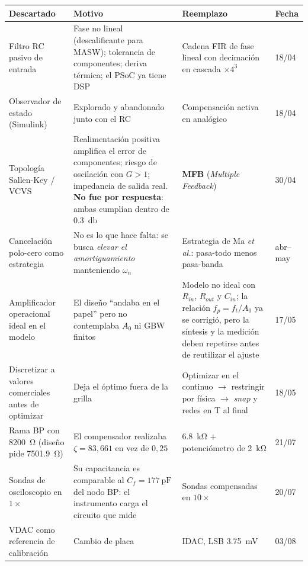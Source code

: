 \begin{center}\footnotesize
\begin{tabularx}{\textwidth}{@{}l X X l@{}}
\toprule
\textbf{Descartado} & \textbf{Motivo} & \textbf{Reemplazo} & \textbf{Fecha} \\
\midrule
Filtro RC pasivo de entrada
& Fase no lineal (descalificante para MASW); tolerancia de componentes; deriva t\'ermica; el PSoC ya tiene DSP
& Cadena FIR de fase lineal con decimaci\'on en cascada $\times4^3$
& 18/04 \\
\addlinespace[2pt]
Observador de estado (Simulink)
& Explorado y abandonado junto con el RC
& Compensaci\'on activa en anal\'ogico
& 18/04 \\
\addlinespace[2pt]
Topolog\'ia Sallen-Key / VCVS
& Realimentaci\'on positiva amplifica el error de componentes; riesgo de oscilaci\'on con $G>1$; impedancia de salida real. \textbf{No fue por respuesta}: ambas cumpl\'ian dentro de \SI{0.3}{\decibel}
& \textbf{MFB} (\emph{Multiple Feedback})
& 30/04 \\
\addlinespace[2pt]
Cancelaci\'on polo-cero como estrategia
& No es lo que hace falta: se busca \emph{elevar el amortiguamiento} manteniendo $\omega_n$
& Estrategia de Ma \emph{et al.}: pasa-todo menos pasa-banda
& abr--may \\
\addlinespace[2pt]
Amplificador operacional ideal en el modelo
& El dise\~no ``andaba en el papel'' pero no contemplaba $A_0$ ni GBW finitos
& Modelo no ideal con $R_{in}$, $R_{out}$ y $C_{in}$; la relaci\'on $f_p=f_t/A_0$ ya se corrigi\'o, pero la s\'intesis y la medici\'on deben repetirse antes de reutilizar el ajuste
& 17/05 \\
\addlinespace[2pt]
Discretizar a valores comerciales antes de optimizar
& Deja el \'optimo fuera de la grilla
& Optimizar en el continuo $\to$ restringir por f\'isica $\to$ \emph{snap} y redes en T al final
& 18/05 \\
\addlinespace[2pt]
Rama BP con \SI{8200}{\ohm} (dise\~no pide \SI{7501.9}{\ohm})
& El compensador realizaba $\zeta = 83{,}661$ en vez de $0{,}25$
& \SI{6.8}{\kilo\ohm} $+$ potenci\'ometro de \SI{2}{\kilo\ohm}
& 21/07 \\
\addlinespace[2pt]
Sondas de osciloscopio en $1\times$
& Su capacitancia es comparable al $C_f = \SI{177}{\pico\farad}$ del nodo BP: el instrumento carga el circuito que mide
& Sondas compensadas en $10\times$
& 20/07 \\
\addlinespace[2pt]
VDAC como referencia de calibraci\'on
& Cambio de placa
& IDAC, LSB \SI{3.75}{\milli\volt}
& 03/08 \\
\bottomrule
\end{tabularx}
\end{center}


